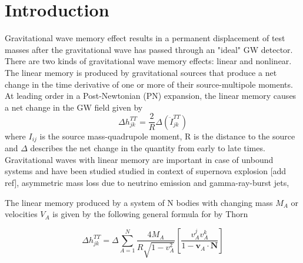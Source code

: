 \documentclass[prd,preprintnumbers,twocolumn,eqsecnum,floatfix,letter]{revtex4}
\begin{document}
\maketitle

\section{Introduction}

Gravitational wave memory effect results in a permanent displacement of test masses after the gravitational wave has passed through an "ideal" GW detector. There are two kinds of gravitational wave memory effects: linear and nonlinear. The linear memory is produced by gravitational sources that produce a net change in the time derivative of one or more of their source-multipole moments. At leading order in a Post-Newtonian (PN) expansion, the linear memory causes a net change in the GW field given by
\begin{equation}
\Delta h^{TT}_{jk} = \frac{2}{R}\Delta\left(\ddot{\mathit{I}}^{TT}_{jk}\right) 
\end{equation} 
where $I_{ij}$ is the source mass-quadrupole moment, R is the distance to the source and $\Delta$ describes the net change in the quantity from early to late times. Gravitational waves with linear memory are important in case of unbound systems and have been studied studied in context of supernova explosion [add ref], asymmetric mass loss due to neutrino emission and gamma-ray-burst jets, \cite{Davies_Melvyn2002,Buonanno_Sigl2015,Kotake_Kei2009}
\par The linear memory produced by a system of N bodies with changing mass $M_A$ or velocities $V_A$ is given by the following general formula for by Thorn \cite{Thorne_Braginskii1987}

\begin{equation}\label{eq:1.2}
\Delta h^{TT}_{jk} = \Delta \sum_{A=1}^{N}\frac{4 M_A}{R\sqrt{1-v^2_A}}\left[\frac{v^j_A v^k_A}{1-\boldsymbol{v}_A\cdot \boldsymbol{N}}\right]
\end{equation} 
\end{document}
